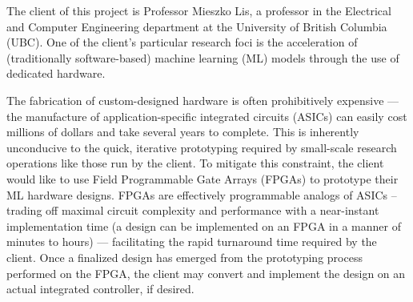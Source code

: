 The client of this project is Professor Mieszko Lis, a professor in the Electrical and Computer Engineering department at the University of British Columbia (UBC). One of the client's particular research foci is the acceleration of (traditionally software-based) machine learning (ML) models through the use of dedicated hardware.

The fabrication of custom-designed hardware is often prohibitively expensive --- the manufacture of application-specific integrated circuits (ASICs) can easily cost millions of dollars and take several years to complete. This is inherently unconducive to the quick, iterative prototyping required by small-scale research operations like those run by the client. To mitigate this constraint, the client would like to use Field Programmable Gate Arrays (FPGAs) to prototype their ML hardware designs. FPGAs are effectively programmable analogs of ASICs -- trading off maximal circuit complexity and performance with a near-instant implementation time (a design can be implemented on an FPGA in a manner of minutes to hours) --- facilitating the rapid turnaround time required by the client. Once a finalized design has emerged from the prototyping process performed on the FPGA, the client may convert and implement the design on an actual integrated controller, if desired.
